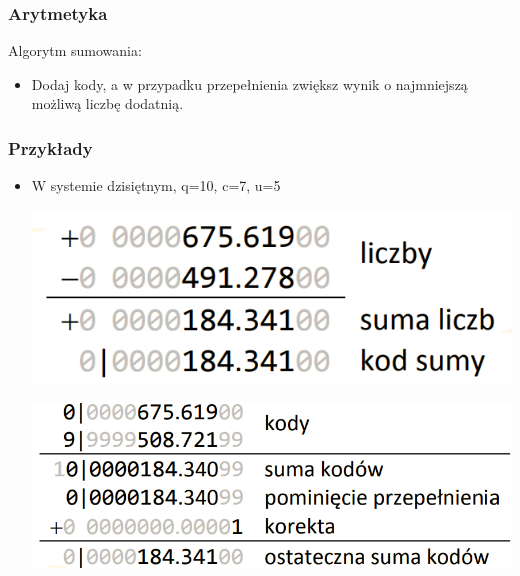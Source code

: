 \documentclass[12pt]{article}
\begin{document}
    \subsubsection{Arytmetyka}
    Algorytm sumowania:
    \begin{itemize}
        \item Dodaj kody, a w przypadku przepełnienia zwiększ wynik o najmniejszą możliwą liczbę dodatnią.
    \end{itemize}
    
    \subsubsection{Przykłady}
    \begin{itemize}
        \item W systemie dzisiętnym, q=10, c=7, u=5
        \begin{center}
            \includegraphics[scale=0.4]{graphics/number-repr/odw-add-dec.png}
        \end{center}
        \begin{center}
            \includegraphics[scale=0.4]{graphics/number-repr/odw-add-dec-2.png}
        \end{center}
        


\end{itemize}
\end{document}
